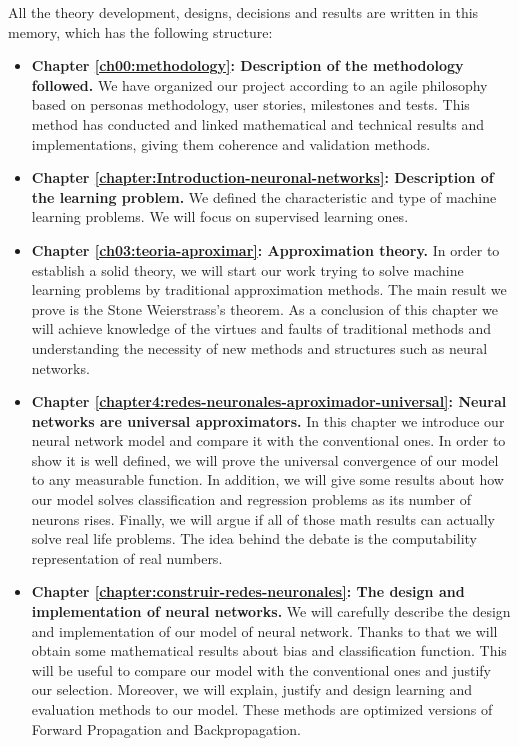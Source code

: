 All the theory development, designs, decisions and results are 
written in this memory, which has the following structure: 
\begin{itemize}
 \item \textbf{Chapter \ref{ch00:methodology}: Description of the methodology followed.} We have organized our project according to an agile philosophy  based on personas methodology, user stories, milestones and tests. This method has conducted and linked mathematical and technical results and implementations, giving them coherence and validation methods. 

 \item \textbf{Chapter \ref{chapter:Introduction-neuronal-networks}: Description of the learning problem.} We defined the characteristic and type of machine learning problems. We will focus on supervised learning ones. 

 \item \textbf{Chapter \ref{ch03:teoria-aproximar}:  Approximation theory.} In order to establish a solid theory, we will start our work trying to solve machine learning problems by traditional approximation methods.  The main result we prove is the Stone Weierstrass's theorem. As a conclusion of this chapter we will achieve knowledge of the virtues and faults of traditional methods and understanding the necessity of new methods and structures such as neural networks. 

 \item \textbf{Chapter \ref{chapter4:redes-neuronales-aproximador-universal}: Neural networks are universal approximators.}  In this chapter we introduce our neural 
 network model and compare it with the conventional ones. In order to show it is well 
 defined, we will prove the universal convergence of our model to any measurable 
 function. In addition, we will give some results about how our model solves 
 classification and regression problems as its number of neurons rises. Finally, we 
 will argue if all of those math results can actually solve real life problems. The 
 idea behind the debate is the computability representation of real numbers. 

 \item \textbf{Chapter  \ref{chapter:construir-redes-neuronales}: The design and implementation of neural networks.} We will carefully  describe the design and 
 implementation of our model of neural network. Thanks to that we will obtain some 
 mathematical results about bias and classification function. This will be useful to 
 compare our model with the conventional ones and justify 
our selection. Moreover, we will explain, justify and design  learning and evaluation 
methods to our model. These methods are optimized versions of Forward Propagation and 
Backpropagation. 


\end{itemize}
